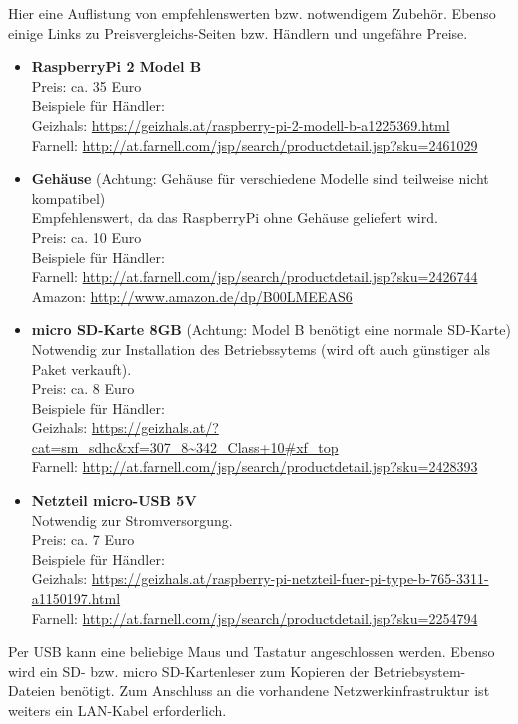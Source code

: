 Hier eine Auflistung von empfehlenswerten bzw. notwendigem Zubehör. Ebenso einige Links zu Preisvergleichs-Seiten bzw. Händlern und ungefähre Preise.
\begin{itemize}
	\item \textbf{RaspberryPi 2 Model B}\\
		Preis: ca. 35 Euro\\
		Beispiele für Händler:\\
		Geizhals: \url{https://geizhals.at/raspberry-pi-2-modell-b-a1225369.html}\\
		Farnell: \url{http://at.farnell.com/jsp/search/productdetail.jsp?sku=2461029}
	\item \textbf{Gehäuse} (Achtung: Gehäuse für verschiedene Modelle sind teilweise nicht kompatibel)\\
		Empfehlenswert, da das RaspberryPi ohne Gehäuse geliefert wird.\\
		Preis: ca. 10 Euro\\
		Beispiele für Händler:\\
		Farnell: \url{http://at.farnell.com/jsp/search/productdetail.jsp?sku=2426744}\\
		Amazon: \url{http://www.amazon.de/dp/B00LMEEAS6}
	\item \textbf{micro SD-Karte 8GB} (Achtung: Model B benötigt eine normale SD-Karte)\\
		Notwendig zur Installation des Betriebssytems (wird oft auch günstiger als Paket verkauft).\\
		Preis: ca. 8 Euro\\
		Beispiele für Händler:\\
		Geizhals: \url{https://geizhals.at/?cat=sm_sdhc&xf=307_8~342_Class+10#xf_top}\\
		Farnell: \url{http://at.farnell.com/jsp/search/productdetail.jsp?sku=2428393}
	\item \textbf{Netzteil micro-USB 5V}\\
		Notwendig zur Stromversorgung.\\
		Preis: ca. 7 Euro\\
		Beispiele für Händler:\\
		Geizhals: \url{https://geizhals.at/raspberry-pi-netzteil-fuer-pi-type-b-765-3311-a1150197.html}\\
		Farnell: \url{http://at.farnell.com/jsp/search/productdetail.jsp?sku=2254794}
\end{itemize}

Per USB kann eine beliebige Maus und Tastatur angeschlossen werden. 
Ebenso wird ein SD- bzw. micro SD-Kartenleser zum Kopieren der Betriebsystem-Dateien benötigt. 
Zum Anschluss an die vorhandene Netzwerkinfrastruktur ist weiters ein LAN-Kabel erforderlich.


